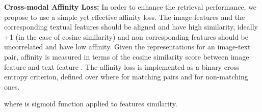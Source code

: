 \documentclass[letterpaper]{article} \usepackage{aaai22}  \usepackage{times}  \usepackage{helvet}  \usepackage{courier}  \usepackage[hyphens]{url}  \usepackage{graphicx} \urlstyle{rm} \def\UrlFont{\rm}  \usepackage{natbib}  \usepackage{caption} \DeclareCaptionStyle{ruled}{labelfont=normalfont,labelsep=colon,strut=off} \frenchspacing  \setlength{\pdfpagewidth}{8.5in}  \setlength{\pdfpageheight}{11in}  \usepackage{algorithm}
\begin{document}
\noindent\textbf{Cross-modal Affinity Loss:}
In order to enhance the retrieval performance, we propose to use a simple yet effective affinity loss. The image features and the corresponding textual features should be aligned and have high similarity, ideally +1 (in the case of cosine similarity) and non corresponding features should be uncorrelated and have low affinity. Given the representations for an image-text pair, affinity is measured in terms of the cosine similarity score between image feature  and text feature . The affinity loss is implemented as a binary cross entropy criterion, defined over   where  for matching pairs and  for non-matching ones.
\setlength{\belowdisplayskip}{0pt} \setlength{\belowdisplayshortskip}{0pt}
\setlength{\abovedisplayskip}{0pt} \setlength{\abovedisplayshortskip}{0pt}

where  is sigmoid function applied to features similarity.
\end{document}
